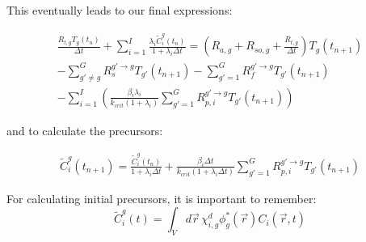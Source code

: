 \documentclass[12pt]{report}
\begin{document}
		This eventually leads to our final expressions:
		
		\begin{eqnarray} 
		\frac{R_{t,g} T_g(t_{n})}{\Delta t} + \sum_{i=1}^{I} \frac{\lambda_i \tilde{C}_i^g(t_{n})}{1+\lambda_i \Delta t} = \left( R_{a,g} + R_{so,g} + \frac{R_{t,g}}{\Delta t} \right) T_g(t_{n+1}) \nonumber \\ - \sum_{g'\neq g}^{G} R_s^{g' \rightarrow g} T_{g'}(t_{n+1}) - \sum_{g'=1}^{G} R_f^{g' \rightarrow g} T_{g'}(t_{n+1}) \nonumber \\ - \sum_{i=1}^{I} \left( \frac{\beta_i \lambda_i}{k_{crit}\left(1+\lambda_i \right)} \sum_{g'=1}^{G} R_{p,i}^{g' \rightarrow g} T_{g'}(t_{n+1}) \right)
		\end{eqnarray}	
		
		and to calculate the precursors:
	
	\begin{eqnarray}
	\tilde{C}_i^g(t_{n+1}) = \frac{\tilde{C}_i^g(t_{n})}{1+\lambda_i \Delta t}  + \frac{\beta_i \Delta t}{k_{crit}\left(1+\lambda_i \Delta t\right)} \sum_{g'=1}^{G} R_{p,i}^{g' \rightarrow g} T_{g'}(t_{n+1})
	\end{eqnarray}
	
	For calculating initial precursors, it is important to remember:
	\begin{equation}
	\tilde{C}_i^g(t) = \int_{V} d\vec{r} \, \chi^d_{i,g} \phi_g^*(\vec{r}) C_i(\vec{r},t) 
	\end{equation}
			
		
		
\end{document}
